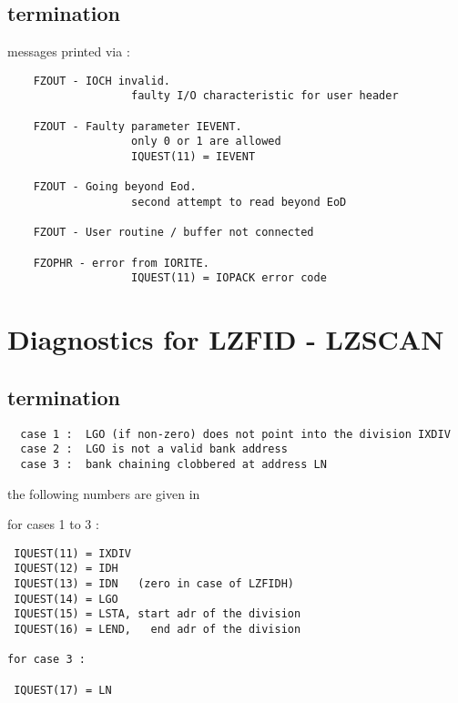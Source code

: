\subsection*{ termination}

messages printed via :

\begin{verbatim}
    FZOUT - IOCH invalid.
                   faulty I/O characteristic for user header

    FZOUT - Faulty parameter IEVENT.
                   only 0 or 1 are allowed
                   IQUEST(11) = IEVENT

    FZOUT - Going beyond Eod.
                   second attempt to read beyond EoD

    FZOUT - User routine / buffer not connected

    FZOPHR - error from IORITE.
                   IQUEST(11) = IOPACK error code
\end{verbatim}

\section{Diagnostics for LZFID - LZSCAN}


\subsection*{ termination}

\begin{verbatim}
  case 1 :  LGO (if non-zero) does not point into the division IXDIV
  case 2 :  LGO is not a valid bank address
  case 3 :  bank chaining clobbered at address LN
\end{verbatim}

the following numbers are given in 

for cases 1 to 3 :

\begin{verbatim}
 IQUEST(11) = IXDIV
 IQUEST(12) = IDH
 IQUEST(13) = IDN   (zero in case of LZFIDH)
 IQUEST(14) = LGO
 IQUEST(15) = LSTA, start adr of the division
 IQUEST(16) = LEND,   end adr of the division

for case 3 :

 IQUEST(17) = LN
\end{verbatim}

